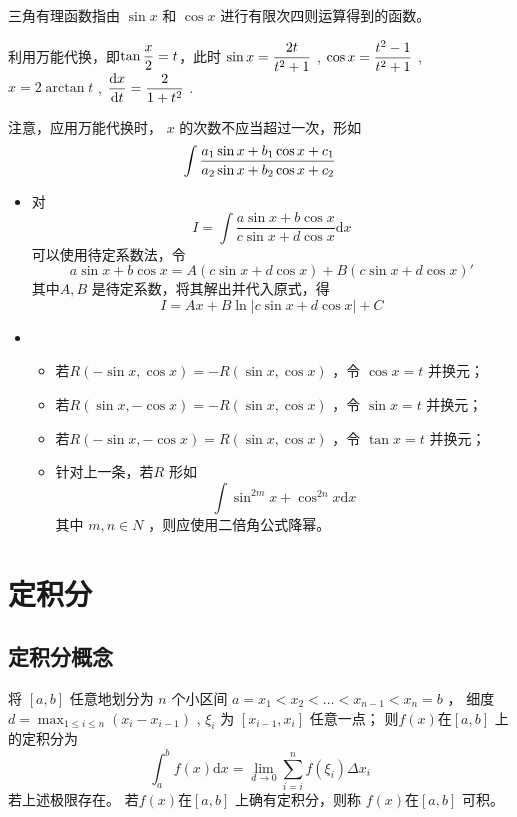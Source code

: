 三角有理函数指由 $ \sin x $ 和 $ \cos x $ 进行有限次四则运算得到的函数。

\begin{Field}[三角有理函数的不定积分一般方法]

    利用万能代换，即$\tan \displaystyle\frac{x}{2} = t $，此时 $ \sin x = \displaystyle\frac{2t}{t^2+1} $ ,
    $ \cos x = \displaystyle\frac{t^2-1}{t^2+1} $ , $ x = 2\arctan t $ ,
    $ \displaystyle\frac{\mathrm{d}x}{\mathrm{d}t} = \displaystyle\frac{2}{1+t^2} $ .
\end{Field}

注意，应用万能代换时， $ x $ 的次数不应当超过一次，形如$$
    \int \displaystyle\frac{a_1\sin x + b_1 \cos x + c_1}{a_2\sin x + b_2 \cos x + c_2}
$$ 


\begin{itemize}
    \item 对 $$
        I = \int \frac{a\sin x + b\cos x}{c\sin x+d\cos x}\mathrm{d}x
    $$ 
    可以使用待定系数法，令$$
        a\sin x+b\cos x = A(c\sin x+d\cos x)+B(c\sin x+ d\cos x)'
    $$ 
    其中$ A,B $ 是待定系数，将其解出并代入原式，得$$
        I=Ax+B\ln|c\sin x+d\cos x|+C
    $$ 
    \item \begin{itemize}
        \item 若$ R(-\sin x, \cos x)=-R(\sin x, \cos x) $ ，令 $ \cos x = t $ 并换元；
        \item 若$ R(\sin x, -\cos x)=-R(\sin x, \cos x) $ ，令 $ \sin x = t $ 并换元；
        \item 若$ R(-\sin x, -\cos x)=R(\sin x, \cos x) $ ，令 $ \tan x = t $ 并换元；
        \item 针对上一条，若$ R $ 形如$$
            \int \sin^{2m} x + \cos^{2n} x \mathrm{d}x
        $$ 其中 $ m,n\in N $ ，则应使用二倍角公式降幂。
    \end{itemize}
\end{itemize}


\section{定积分}

\subsection{定积分概念}

\begin{Def}[]

    将 $ [a,b] $ 任意地划分为 $ n $ 个小区间 $ a = x_1<x_2<\dots<x_{n-1}<x_n=b $ ，
    细度 $ d=\max_{1\leq i \leq n}(x_i-x_{i-1}) $ , $ \xi_i $ 为 $ [x_{i-1},x_i] $ 任意一点；
    则$ f(x) $在$ [a,b] $ 上的定积分为$$
        \int_a^b f(x)\mathrm{d}x = {\displaystyle\lim_{d\rightarrow 0}}
        \sum_{i=i}^nf(\xi_i)\Delta x_i
    $$ 
    若上述极限存在。
    若$ f(x) $在$ [a,b] $ 上确有定积分，则称 $ f(x) $在$ [a,b] $ 可积。
\end{Def}

